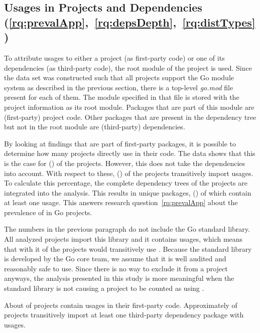 \subsection{Usages in Projects and Dependencies (\ref{rq:prevalApp},~\ref{rq:depsDepth},~\ref{rq:distTypes})}\label{subsec:go-geiger:evaluation:unsafe-usage}

To attribute \unsafe{} usages to either a project (as first-party code) or one of its dependencies (as third-party
code), the root module of the project is used.
Since the data set was constructed such that all projects support the Go module system as described in the previous
section, there is a top-level \textit{go.mod} file present for each of them.
The module specified in that file is stored with the project information as its root module.
Packages that are part of this module are (first-party) project code.
Other packages that are present in the dependency tree but not in the root module are (third-party) dependencies.

By looking at \unsafe{} findings that are part of first-party packages, it is possible to determine how many projects
directly use \unsafe{} in their code.
The data shows that this is the case for \unsafeProjects{} (\percentageUnsafeProjects{}) of the \projsAnalyzed{}
projects.
However, this does not take the dependencies into account.
With respect to these, \unsafeTransitiveWithDependencies{} (\percentageUnsafeTransitiveWithDependencies{}) of the
projects transitively import \unsafe{} usages.
To calculate this percentage, the complete dependency trees of the projects are integrated into the analysis.
This results in \packagesAnalyzed{} unique packages, \unsafePackages{} (\percentageUnsafePackages{}) of which contain at
least one \unsafe{} usage.
This answers research question~\ref{rq:prevalApp} about the prevalence of \unsafe{} in Go projects.

The numbers in the previous paragraph do not include the Go standard library.
All analyzed projects import this library and it contains \unsafe{} usages, which means that with it  of
the projects would transitively use \unsafe{}.
Because the standard library is developed by the Go core team, we assume that it is well audited and reasonably safe to
use.
Since there is no way to exclude it from a project anyways, the analysis presented in this study is more meaningful
when the standard library is not causing a project to be counted as using \unsafe{}.

\begin{answerToRQ}[\ref{rq:prevalApp}]
    About \percentageUnsafeProjectsRounded{} of projects contain \unsafe{} usages in their first-party code.
    Approximately \percentageUnsafeTransitiveWithDependenciesRounded{} of projects transitively import at least one
    third-party dependency package with \unsafe{} usages.
\end{answerToRQ}

